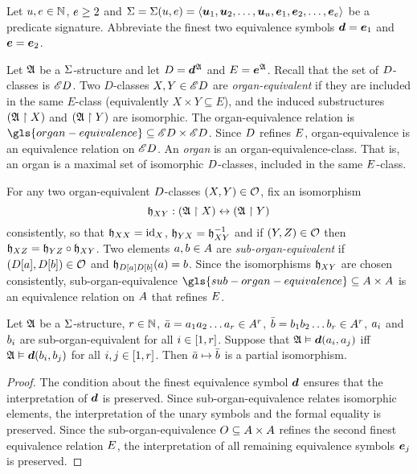 
Let $u, e \in \mathbb{N}$, $e \geq 2$ and
$\mathrm{\Sigma} = \mathrm{\Sigma}(u, e) = 
\left\langle \bm{u}_{1},\bm{u}_{2},\dots,\bm{u}_{u},\bm{e}_{1},\bm{e}_{2},\dots,\bm{e}_{e} \right\rangle$
be a predicate signature.
Abbreviate the finest two equivalence symbols $\bm{d} = \bm{e}_{1}$ and $\bm{e} = \bm{e}_{2}$.
\begin{definition}
Let $\mathfrak{A}$ be a $\mathrm{\Sigma}$-structure and let $D = \bm{d}^{\mathfrak{A}}$ and
$E = \bm{e}^{\mathfrak{A}}$.
Recall that the set of $D$-classes is ${\mathscr{E}D}$.
Two $D$-classes $X, Y \in {\mathscr{E}D}$ are \emph{organ-equivalent}
if they are included in the same $E$-class (equivalently $X \times Y \subseteq
E$), and the induced substructures $(\mathfrak{A} \restriction X)$ and $(\mathfrak{A}
\restriction Y)$ are isomorphic.
The organ-equivalence relation is
$\gls{organ-equivalence} \subseteq \domXX{\Ecl\relD}$.
Since $D$ refines $E$, organ-equivalence is an equivalence relation
on ${\mathscr{E}D}$.
An \emph{organ} is an organ-equivalence-class. That is, an organ
is a maximal set of isomorphic $D$-classes, included in the same
$E$-class.

For any two organ-equivalent $D$-classes $(X, Y) \in \mathcal{O}$,
fix an isomorphism
\[
  \mathfrak{h}_{XY} : (\mathfrak{A} \restriction X) \leftrightarrow (\mathfrak{A} \restriction Y)
\]
consistently, so that $\mathfrak{h}_{XX} = \operatorname{id}_{X}$,
$\mathfrak{h}_{YX} = \mathfrak{h}_{XY}^{-1}$
and if $(Y, Z) \in \mathcal{O}$ then
$\mathfrak{h}_{XZ} = \mathfrak{h}_{YZ} \circ \mathfrak{h}_{XY}$.
Two elements $a, b \in A$ are \emph{sub-organ-equivalent}
if $(D[a], D[b]) \in \mathcal{O}$ and
$\mathfrak{h}_{D[a]D[b]}(a) = b$.
Since the isomorphisms $\mathfrak{h}_{XY}$ are chosen consistently,
sub-organ-equivalence 
$\gls{sub-organ-equivalence} \subseteq \domAA$ is an equivalence relation on
$A$ that refines $E$.
\end{definition}

\begin{remark}\label{rem:monadic-same-organ-iso}
Let $\mathfrak{A}$ be a $\mathrm{\Sigma}$-structure, $r \in \mathbb{N}$,
$\bar{a} = a_{1}a_{2}\dots a_{r} \in A^r$,
$\bar{b} = b_{1}b_{2}\dots b_{r} \in A^r$,
$a_{i}$ and $b_{i}$ are sub-organ-equivalent for all $i \in [1,r]$.
Suppose that
$\mathfrak{A} \vDash \bm{d}(a_{i}, a_{j})$ iff $\mathfrak{A} \vDash \bm{d}(b_{i}, b_{j})$
for all $i, j \in [1,r]$.
Then $\bar{a} \mapsto \bar{b}$ is a partial isomorphism.
\end{remark}
\begin{proof}
The condition about the finest equivalence symbol $\bm{d}$ ensures that the
interpretation of $\bm{d}$ is preserved.
Since sub-organ-equivalence relates isomorphic elements, the interpretation of
the unary symbols and the formal equality is preserved.
Since the sub-organ-equivalence $O \subseteq {A\times A}$ refines the
second finest equivalence relation $E$, the interpretation of all remaining
equivalence symbols $\bm{e}_{j}$ is preserved.
\end{proof}

